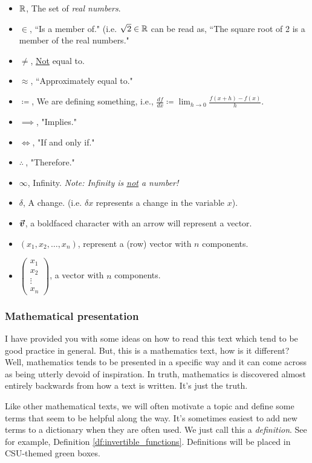     \begin{itemize}
        \item $\mathbb{R}$, The set of \emph{real numbers}.
        \item $\in$, ``Is a member of." (i.e. $\sqrt{2}\in \mathbb{R}$ can be read as, ``The square root of 2 is a member of the real numbers."
        \item $\neq$, \underline{Not} equal to.
        \item $\approx$, ``Approximately equal to."
        \item $\coloneqq$, We are defining something, i.e., $\frac{df}{dx}\coloneqq \lim_{h\to 0}\frac{f(x+h)-f(x)}{h}$.
        \item $\implies$, "Implies."
        \item $\iff$, "If and only if."
        \item $\therefore~$, "Therefore."
        \item $\infty$, Infinity.  \emph{Note: Infinity is \underline{not} a number!}
        \item $\delta$, A change. (i.e. $\delta x$ represents a change in the variable $x$).
        \item $\boldsymbol{\boldsymbol{\vec{v}}}$, a boldfaced character with an arrow will represent a vector.
        \item $(x_1,x_2,\dots,x_n)$, represent a (row) vector with $n$ components.
        \item $\begin{pmatrix} x_1\\ x_2\\ \vdots \\ x_n\end{pmatrix}$, a vector with $n$ components.
    \end{itemize}

    \subsubsection{Mathematical presentation}

    I have provided you with some ideas on how to read this text which tend to be good practice in general.  But, this is a mathematics text, how is it different? Well, mathematics tends to be presented in a specific way and it can come across as being utterly devoid of inspiration.  In truth, mathematics is discovered almost entirely backwards from how a text is written.  It's just the truth.

    Like other mathematical texts, we will often motivate a topic and define some terms that seem to be helpful along the way.  It's sometimes easiest to add new terms to a dictionary when they are often used.  We just call this a \emph{definition}. See for example, Definition \ref{df:invertible_functions}. Definitions will be placed in CSU-themed green boxes.

